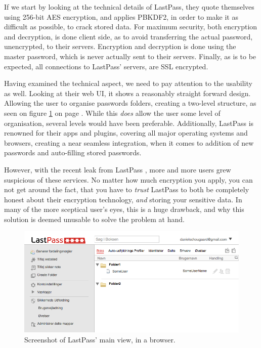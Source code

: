 			If we start by looking at the technical details of LastPass, they quote themselves using 256-bit AES encryption, and applies PBKDF2, in order to make it as difficult as possible, to crack stored data. For maximum security, both encryption and decryption, is done client side\cite{lastpass_cleintsideencryption}, as to avoid transferring the actual password, unencrypted, to their servers. Encryption and decryption is done using the master password, which is never actually sent to their servers. Finally, as is to be expected, all connections to LastPass' servers, are SSL encrypted.

			Having examined the technical aspect, we need to pay attention to the usability as well. Looking at their web UI, it shows a reasonably straight forward design. Allowing the user to organise passwords folders, creating a two-level structure, as seen on figure \ref{fig:lastpass_main} on page \pageref{fig:lastpass_main}. While this \emph{does} allow the user some level of organisation, several levels would have been preferable. Additionally, LastPass is renowned for their apps and plugins, covering all major operating systems and browsers, creating a near seamless integration, when it comes to addition of new passwords and auto-filling stored passwords.

			However, with the recent leak from LastPass \cite{lastpass_leak}, more and more users grew suspicious of these services. No matter how much encryption you apply, you can not get around the fact, that you have to \emph{trust} LastPass to both be completely honest about their encryption technology, \emph{and} storing your sensitive data. In many of the more sceptical user's eyes, this is a huge drawback, and why this solution is deemed unusable to solve the problem at hand.

			\begin{figure}[h!]
				\centering
				\includegraphics[width=\textwidth]{figures/analysis/lastpass_main.png}
				\caption{Screenshot of LastPass' main view, in a browser.}
				\label{fig:lastpass_main}
			\end{figure}



